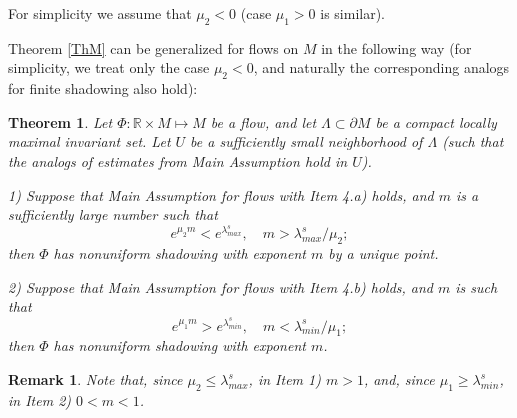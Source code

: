 \documentclass[11pt]{article}
\newcounter{razdel}[section]
\theoremstyle{Mystyle}
\newtheorem{Theorem}[razdel]{Theorem}
\newtheorem{Remark}[razdel]{Remark}
\begin{document}
For simplicity we assume that $\mu_2<0$ (case $\mu_1>0$ is similar).


%
%
%
%


Theorem \ref{ThM} can be generalized for flows on $M$ in the following way (for simplicity, we treat only the case $\mu_2<0$, and naturally the corresponding analogs for finite shadowing also hold):
\begin{Theorem}
\label{Th2}
Let $\Phi:\mathbb{R}\times M\mapsto M$ be a flow, and let $\Lambda\subset \partial M$ be a compact locally maximal invariant
set. Let $U$ be a sufficiently small neighborhood of $\Lambda$ (such that the analogs of estimates from Main Assumption hold in $U$).

1) Suppose that Main Assumption for flows with Item 4.a) holds, and $m$ is a sufficiently large number such that
\begin{equation}
\label{muineqflows}
e^{\mu_2 m}<e^{\lambda_{max}^{s}},\quad m>\lambda^{s}_{max}/\mu_2;
\end{equation}
then $\Phi$ has nonuniform shadowing with exponent $m$ by a unique point.

2) Suppose that Main Assumption for flows with Item 4.b) holds, and $m$ is such that
\begin{equation}
\label{muineqflows2}
e^{\mu_1 m}>e^{\lambda_{min}^{s}},\quad m<\lambda^{s}_{min}/\mu_1;
\end{equation}
then $\Phi$ has nonuniform shadowing with exponent $m$.
\end{Theorem}

\begin{Remark}
Note that, since $\mu_2\leq\lambda^s_{max}$, in Item 1) $m>1$, and, since $\mu_1\geq\lambda^{s}_{min}$, in Item 2) $0<m<1$.
\end{Remark}
\end{document}
